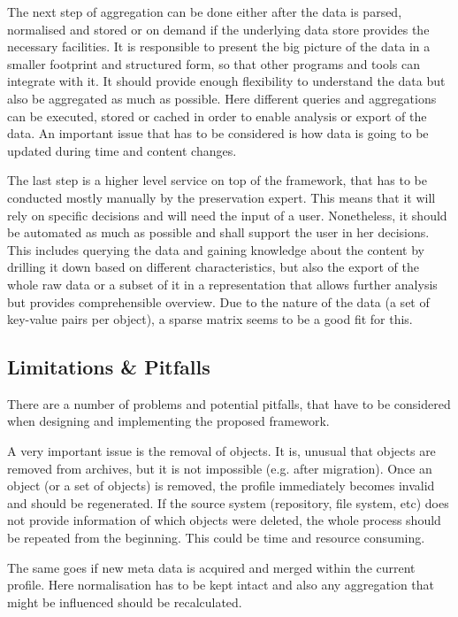 The next step of aggregation can be done either after the data is parsed, normalised and stored or on demand if the underlying data store provides the necessary facilities. It is responsible to present the big picture of the data in a smaller footprint and structured form, so that other programs and tools can integrate with it. It should provide enough flexibility to understand the data but also be aggregated as much as possible. Here different queries and aggregations can be executed, stored or cached in order to enable analysis or export of the data. An important issue that has to be considered is how data is going to be updated during time and content changes. 

The last step is a higher level service on top of the framework, that has to be conducted mostly manually by the preservation expert. This means that it will rely on specific decisions and will need the input of a user. Nonetheless, it should be automated as much as possible and shall support the user in her decisions. This includes querying the data and gaining knowledge about the content by drilling it down based on different characteristics, but also the export of the whole raw data or a subset of it in a representation that allows further analysis but provides comprehensible overview.
Due to the nature of the data (a set of key-value pairs per object), a sparse matrix seems to be a good fit for this.

\subsection{Limitations \& Pitfalls}
There are a number of problems and potential pitfalls, that have to be considered when designing and implementing the proposed framework.

A very important issue is the removal of objects. It is, unusual that objects are removed from archives, but it is not impossible (e.g. after migration). Once an object (or a set of objects) is removed, the profile immediately becomes invalid and should be regenerated. If the source system (repository, file system, etc) does not provide information of which objects were deleted, the whole process should be repeated from the beginning. This could be time and resource consuming.

The same goes if new meta data is acquired and merged within the current profile. Here normalisation has to be kept intact and also any aggregation that might be influenced should be recalculated.

